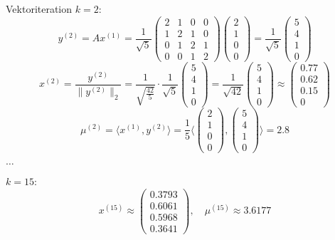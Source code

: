 \begin{example}{Vektoriteration}
    $k = 2$:
    \[
        y^{(2)} = A x^{(1)} = \frac{1}{\sqrt{5}}
        \begin{pmatrix}
            2 & 1 & 0 & 0 \\
            1 & 2 & 1 & 0 \\
            0 & 1 & 2 & 1 \\
            0 & 0 & 1 & 2
        \end{pmatrix}
        \begin{pmatrix}
            2 \\ 1 \\ 0 \\ 0
        \end{pmatrix}
        = \frac{1}{\sqrt{5}}
        \begin{pmatrix}
            5 \\ 4 \\ 1 \\ 0
        \end{pmatrix}
    \]
    \[
        x^{(2)} = \frac{y^{(2)}}{ \| y^{(2)} \|_2 } = \frac{1}{\sqrt{\frac{42}{5}}} \cdot \frac{1}{\sqrt{5}}
        \begin{pmatrix}
            5 \\ 4 \\ 1 \\ 0
        \end{pmatrix}
        = \frac{1}{\sqrt{42}}
        \begin{pmatrix}
            5 \\ 4 \\ 1 \\ 0
        \end{pmatrix}
        \approx
        \begin{pmatrix}
            0.77 \\ 0.62 \\ 0.15 \\ 0
        \end{pmatrix}
    \]
    \[
        \mu^{(2)} = \langle x^{(1)}, y^{(2)} \rangle = \frac{1}{5} \langle
        \begin{pmatrix}
            2 \\ 1 \\ 0 \\ 0
        \end{pmatrix},
        \begin{pmatrix}
            5 \\ 4 \\ 1 \\ 0
        \end{pmatrix}
        \rangle
        = 2.8
    \]

    $\ldots$

    $k = 15$:
    \[
        x^{(15)} \approx
        \begin{pmatrix}
            0.3793 \\ 0.6061 \\ 0.5968 \\ 0.3641
        \end{pmatrix}
        , \quad
        \mu^{(15)} \approx 3.6177
    \]
\end{example}

